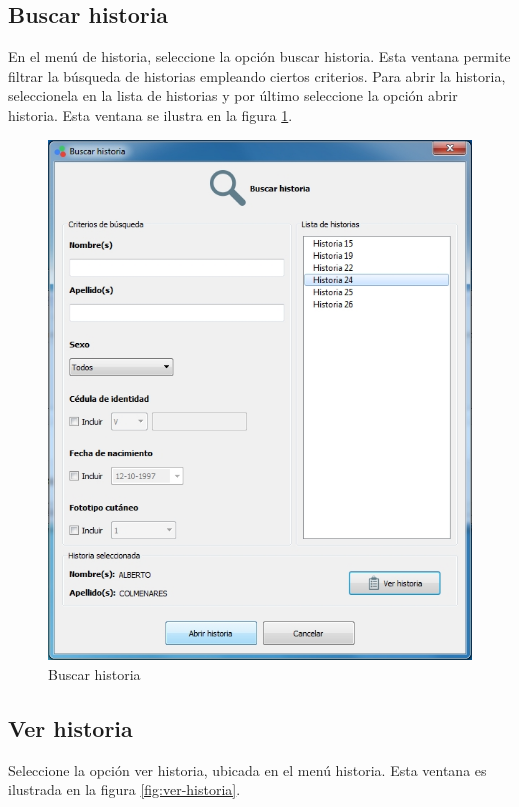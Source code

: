 	\subsection*{Buscar historia}
	
	En el men\'{u} de historia, seleccione la opci\'{o}n buscar historia. Esta ventana permite filtrar la b\'{u}squeda de historias empleando ciertos criterios. Para abrir la historia, seleccionela en la lista de historias y por \'{u}ltimo seleccione la opci\'{o}n abrir historia. Esta ventana se ilustra en la figura \ref{fig:buscar-historia}.
	
\begin{figure}[H]
  \centering
  \includegraphics[width=.9\linewidth]{./img/buscar-historia.jpg}
\caption[]{Buscar historia\label{fig:buscar-historia}}
\end{figure}
	
	\subsection*{Ver historia}
	
	Seleccione la opci\'{o}n ver historia, ubicada en el men\'{u} historia. Esta ventana es ilustrada en la figura \ref{fig:ver-historia}.
	
